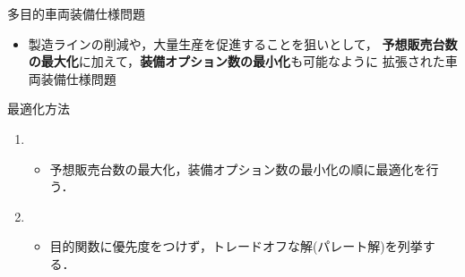 \documentclass[dvipdfmx, 11pt]{beamer}
\begin{document}
\begin{frame}{多目的車両装備仕様問題}
 \begin{itemize}
  \item 製造ラインの削減や，大量生産を促進することを狙いとして，
	{\bf 予想販売台数の最大化}に加えて，{\bf 装備オプション数の最小化}も可能なように
	拡張された車両装備仕様問題
 \end{itemize}

 \begin{block}{最適化方法}
  \begin{enumerate}
   \item {}
	 \begin{itemize}
	  \item 予想販売台数の最大化，装備オプション数の最小化の順に最適化を行う．
	 \end{itemize}
   \item {}
	 \begin{itemize}
	  \item 目的関数に優先度をつけず，トレードオフな解(パレート解)を列挙する．
	 \end{itemize}
  \end{enumerate}
 \end{block}

\end{frame}
\end{document}

